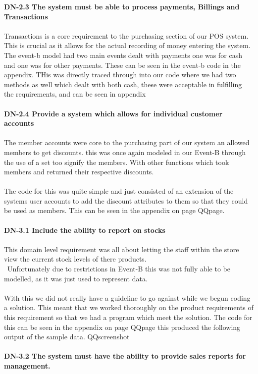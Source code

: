 \documentclass[a4paper]{article}
\begin{document}
\textbf{DN-2.3 The system must be able to process payments, Billings and Transactions}
\\\\
Transactions is a core requirement to the purchasing section of our POS system. This is crucial as it allows for the actual recording of money entering the system. The event-b model had two main events dealt with payments one was for cash and one was for other payments. These can be seen in the event-b code in the appendix. THis was directly traced through into our code where we had two methods as well which dealt with both cash, these were acceptable in fulfilling the requirements, and can be seen in appendix
\\\\
\textbf{DN-2.4 Provide a system which allows for individual customer accounts}
\\\\
The member accounts were core to the purchasing part of our system an allowed members to get discounts. this was once again modeled in our Event-B through the use of a set too signify the members. With other functions which took members and returned their respective discounts.
\\\\
The code for this was quite simple and just consisted of an extension of the systems user accounts to add the discount attributes to them so that they could be used as members.  This can be seen in the appendix on page QQpage. 
\\\\
\textbf{DN-3.1 Include the ability to report on stocks}
\\\\
This domain level requirement  was all about letting the staff within the store view the current stock levels of there products. 
\\\
Unfortunately due to restrictions in Event-B this was not fully able to be modelled, as it was just used to represent data. 
\\\\
With this we did not really have a guideline to go against while we begun coding a solution. This meant that we worked thoroughly on the product requirements of this requirement so that we had a program which meet the solution. The code for this can be seen in the appendix on page QQpage  this produced the following output of the sample data. QQscreenshot 
\\\\
\textbf{DN-3.2 The system must have the ability to provide sales reports for management.}
\end{document}
